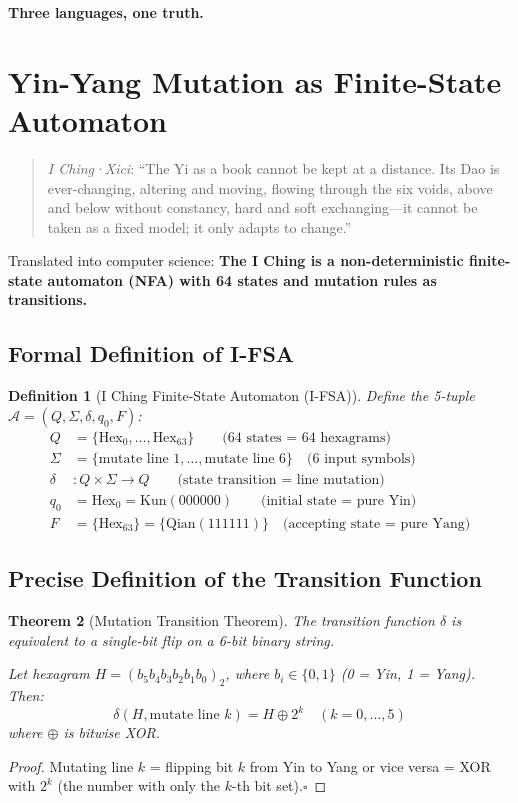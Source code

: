 \documentclass[conference]{IEEEtran}
\newtheorem{theorem}{Theorem}[section]
\newtheorem{definition}[theorem]{Definition}
\theoremstyle{remark}
\begin{document}
\textbf{Three languages, one truth.}

\section{Yin-Yang Mutation as Finite-State Automaton}

\begin{quote}
\emph{I Ching·Xici}: ``The Yi as a book cannot be kept at a distance. Its Dao is ever-changing, altering and moving, flowing through the six voids, above and below without constancy, hard and soft exchanging---it cannot be taken as a fixed model; it only adapts to change.''
\end{quote}

Translated into computer science: \textbf{The I Ching is a non-deterministic finite-state automaton (NFA) with 64 states and mutation rules as transitions.}

\subsection{Formal Definition of I-FSA}

\begin{definition}[I Ching Finite-State Automaton (I-FSA)]
Define the 5-tuple $\mathcal{A} = (Q, \Sigma, \delta, q_0, F)$:
\begin{align*}
Q &= \{\text{Hex}_0, \ldots, \text{Hex}_{63}\} \qquad\text{(64 states = 64 hexagrams)}\\
\Sigma &= \{\text{mutate line 1}, \ldots, \text{mutate line 6}\} \quad\text{(6 input symbols)}\\
\delta &: Q \times \Sigma \to Q \qquad\text{(state transition = line mutation)}\\
q_0 &= \text{Hex}_0 = \text{Kun}(000000) \qquad\text{(initial state = pure Yin)}\\
F &= \{\text{Hex}_{63}\} = \{\text{Qian}(111111)\} \quad\text{(accepting state = pure Yang)}
\end{align*}
\end{definition}

\subsection{Precise Definition of the Transition Function}

\begin{theorem}[Mutation Transition Theorem]
The transition function $\delta$ is equivalent to a single-bit flip on a 6-bit binary string.

Let hexagram $H = (b_5 b_4 b_3 b_2 b_1 b_0)_2$, where $b_i \in \{0,1\}$ (0 = Yin, 1 = Yang). Then:
\[
\delta(H, \text{mutate line }k) = H \oplus 2^k \quad (k = 0,\ldots,5)
\]
where $\oplus$ is bitwise XOR.
\end{theorem}
\begin{proof}
Mutating line $k$ = flipping bit $k$ from Yin to Yang or vice versa = XOR with $2^k$ (the number with only the $k$-th bit set).\hfill$\square$
\end{proof}
\end{document}
